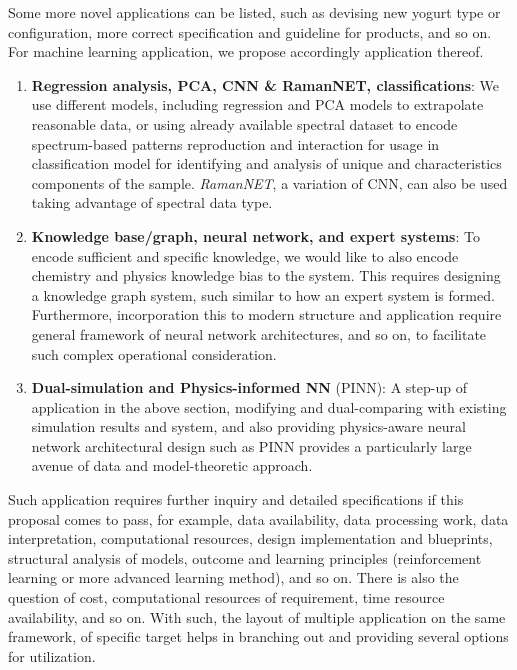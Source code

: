 \documentclass{iopjournal}
\begin{document}
Some more novel applications can be listed, such as devising new yogurt type or configuration, more correct specification and guideline for products, and so on. For machine learning application, we propose accordingly application thereof. 
\begin{enumerate}[topsep=1pt, itemsep = 2pt]
  \item \textbf{Regression analysis, PCA, CNN \& RamanNET, classifications}: We use different models, including regression and PCA models to extrapolate reasonable data, or using already available spectral dataset to encode spectrum-based patterns reproduction and interaction for usage in classification model for identifying and analysis of unique and characteristics components of the sample. \textit{RamanNET}, a variation of CNN, can also be used taking advantage of spectral data type. 
  \item \textbf{Knowledge base/graph, neural network, and expert systems}: To encode sufficient and specific knowledge, we would like to also encode chemistry and physics knowledge bias to the system. This requires designing a knowledge graph system, such similar to how an expert system is formed. Furthermore, incorporation this to modern structure and application require general framework of neural network architectures, and so on, to facilitate such complex operational consideration. 
  \item \textbf{Dual-simulation and Physics-informed NN} (PINN): A step-up of application in the above section, modifying and dual-comparing with existing simulation results and system, and also providing physics-aware neural network architectural design such as PINN provides a particularly large avenue of data and model-theoretic approach.
\end{enumerate}

Such application requires further inquiry and detailed specifications if this proposal comes to pass, for example, data availability, data processing work, data interpretation, computational resources, design implementation and blueprints, structural analysis of models, outcome and learning principles (reinforcement learning or more advanced learning method), and so on. There is also the question of cost, computational resources of requirement, time resource availability, and so on. With such, the layout of multiple application on the same framework, of specific target helps in branching out and providing several options for utilization. 

\clearpage
\appendix
\end{document}
